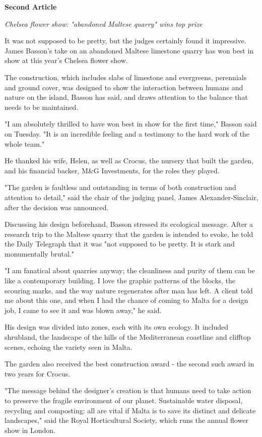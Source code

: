 \documentclass[12pt]{article}
\begin{document}
\textbf{Second Article}

\emph{Chelsea flower show: "abandoned Maltese quarry" wins top prize}

It was not supposed to be pretty, but the judges certainly found it impressive. James Basson's take on an abandoned Maltese limestone quarry has won best in show at this year's Chelsea flower show.

The construction, which includes slabs of limestone and evergreens, perennials and ground cover, was designed to show the interaction between humans and nature on the island, Basson has said, and draws attention to the balance that needs to be maintained.
 
"I am absolutely thrilled to have won best in show for the first time," Basson said on Tuesday. "It is an incredible feeling and a testimony to the hard work of the whole team."

He thanked his wife, Helen, as well as Crocus, the nursery that built the garden, and his financial backer, M\&G Investments, for the roles they played.

"The garden is faultless and outstanding in terms of both construction and attention to detail," said the chair of the judging panel, James Alexander-Sinclair, after the decision was announced.

Discussing his design beforehand, Basson stressed its ecological message. After a research trip to the Maltese quarry that the garden is intended to evoke, he told the Daily Telegraph that it was "not supposed to be pretty. It is stark and monumentally brutal."

"I am fanatical about quarries anyway; the cleanliness and purity of them can be like a contemporary building. I love the graphic patterns of the blocks, the scouring marks, and the way nature regenerates after man has left. A client told me about this one, and when I had the chance of coming to Malta for a design job, I came to see it and was blown away," he said.

His design was divided into zones, each with its own ecology. It included shrubland, the landscape of the hills of the Mediterranean coastline and clifftop scenes, echoing the variety seen in Malta.

The garden also received the best construction award - the second such award in two years for Crocus.

"The message behind the designer's creation is that humans need to take action to preserve the fragile environment of our planet. Sustainable water disposal, recycling and composting: all are vital if Malta is to save its distinct and delicate landscapes," said the Royal Horticultural Society, which runs the annual flower show in London.
\end{document}
